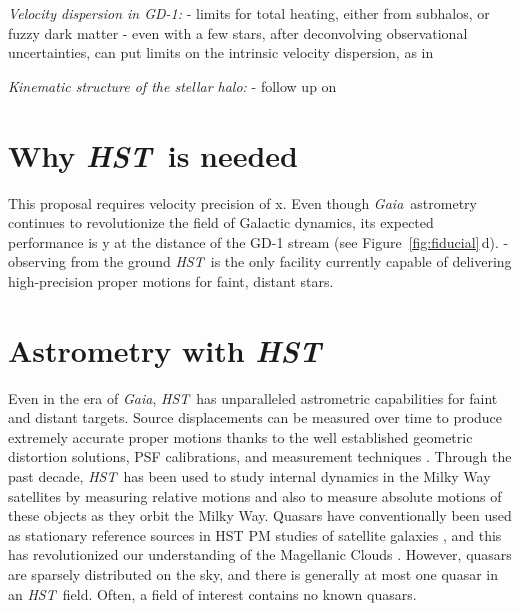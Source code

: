 \documentclass[12pt]{article}
\newcommand{\hst}{\textsl{HST}}
\newcommand{\gaia}{\textsl{Gaia}}
\begin{document}
\emph{Velocity dispersion in GD-1:}
- limits for total heating, either from subhalos, or fuzzy dark matter
- even with a few stars, after deconvolving observational uncertainties, can put limits on the intrinsic velocity dispersion, as in \textcite{sohn2016}

\emph{Kinematic structure of the stellar halo:}
- follow up on \parencite{deason2013}

\section*{Why \hst\ is needed}
This proposal requires velocity precision of x.
Even though \gaia\ astrometry continues to revolutionize the field of Galactic dynamics, its expected performance is y at the distance of the GD-1 stream (see Figure~\ref{fig:fiducial}\,d).
- observing from the ground
\hst\ is the only facility currently capable of delivering high-precision proper motions for faint, distant stars.


%
%
\describeobservations   %
\section*{Astrometry with \hst}
Even in the era of \gaia, \hst\ has unparalleled astrometric capabilities for faint and distant targets.
Source displacements can be measured over time to produce extremely accurate proper motions thanks to the well established geometric distortion solutions, PSF calibrations, and measurement techniques \parencite[e.g.,][]{anderson2003}.
Through the past decade, \hst\ has been used to study internal dynamics in the Milky Way satellites by measuring relative motions \parencite[e.g., ][]{anderson2010} and also to measure absolute motions of these objects as they orbit the Milky Way.
Quasars have conventionally been used as stationary reference sources in HST PM studies of satellite galaxies \parencite[e.g.,][]{kallivayalil2006, kallivayalil2013, piatek2008}, and this has revolutionized our understanding of the Magellanic Clouds \parencite{besla2007}.
However, quasars are sparsely distributed on the sky, and there is generally at most one quasar in an \hst\ field.
Often, a field of interest contains no known quasars.
\end{document}
